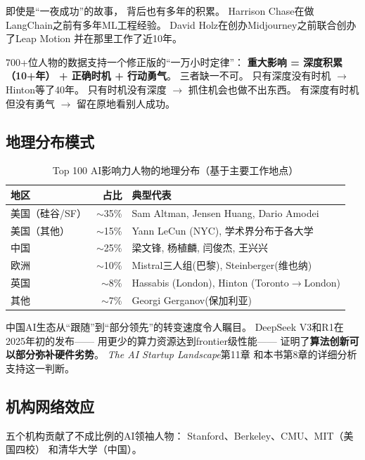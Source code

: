 即使是``一夜成功''的故事，
背后也有多年的积累。
Harrison Chase在做LangChain之前有多年ML工程经验。
David Holz在创办Midjourney之前联合创办了Leap Motion
并在那里工作了近10年。

\begin{corebox}[一万小时定律的AI版本]
700+位人物的数据支持一个修正版的``一万小时定律''：
\textbf{重大影响 = 深度积累（10+年） + 正确时机 + 行动勇气}。
三者缺一不可。
只有深度没有时机 $\rightarrow$ Hinton等了40年。
只有时机没有深度 $\rightarrow$ 抓住机会也做不出东西。
有深度有时机但没有勇气 $\rightarrow$ 留在原地看别人成功。
\end{corebox}

\subsection{地理分布模式}

\begin{table}[htbp]
\centering
\caption{Top 100 AI影响力人物的地理分布（基于主要工作地点）}
\label{tab:geo-distribution}
\small
\begin{tabularx}{\textwidth}{l r X}
\toprule
\rowcolor{figLightGray}
\textbf{地区} & \textbf{占比} & \textbf{典型代表} \\
\midrule
美国（硅谷/SF） & $\sim$35\% & Sam Altman, Jensen Huang, Dario Amodei \\
美国（其他） & $\sim$15\% & Yann LeCun (NYC), 学术界分布于各大学 \\
中国 & $\sim$25\% & 梁文锋, 杨植麟, 闫俊杰, 王兴兴 \\
欧洲 & $\sim$10\% & Mistral三人组(巴黎), Steinberger(维也纳) \\
英国 & $\sim$8\% & Hassabis (London), Hinton (Toronto$\rightarrow$London) \\
其他 & $\sim$7\% & Georgi Gerganov(保加利亚) \\
\bottomrule
\end{tabularx}
\end{table}

中国AI生态从``跟随''到``部分领先''的转变速度令人瞩目。
DeepSeek V3和R1在2025年初的发布——
用更少的算力资源达到frontier级性能——
证明了\textbf{算法创新可以部分弥补硬件劣势}。
\textit{The AI Startup Landscape}第11章
和本书第8章的详细分析支持这一判断。

\subsection{机构网络效应}

五个机构贡献了不成比例的AI领袖人物：
Stanford、Berkeley、CMU、MIT（美国四校）
和清华大学（中国）。

